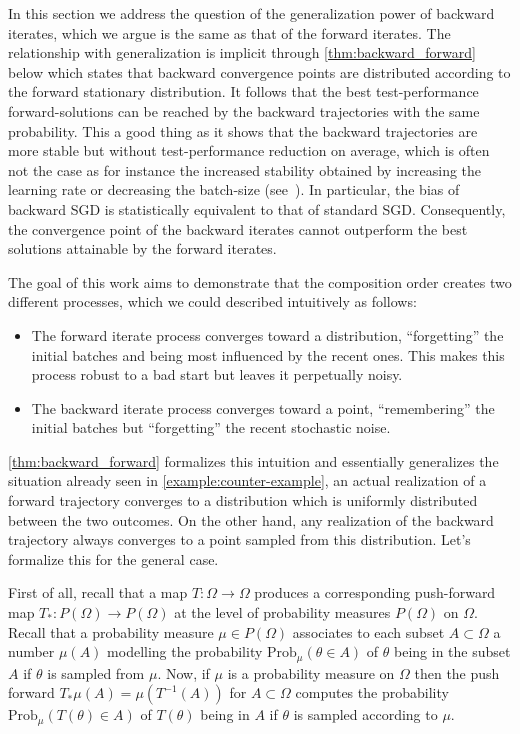 \documentclass[10pt]{article} %
\theoremstyle{plain}
\theoremstyle{definition}
\theoremstyle{remark}
\begin{document}
In this section we address the question of the generalization power of backward iterates, which we argue is the same as that of the forward iterates. The relationship with generalization is implicit through \cref{thm:backward_forward} below which states that backward convergence points are distributed according to the forward stationary distribution. It follows that the best test-performance forward-solutions can be reached by the backward trajectories with the same probability. This a good thing  as it shows that the backward trajectories are more stable but without test-performance reduction on average, which is often not the case as for instance the increased stability obtained by increasing the learning rate or decreasing the batch-size (see~\cite{dherin2022why}). 
In particular, the bias of backward SGD is statistically equivalent to that of standard SGD.
Consequently, the convergence point of the backward iterates cannot outperform the best solutions attainable by the forward iterates. 

The goal of this work aims to demonstrate that the composition order creates two different processes, which we could described intuitively as follows:

\begin{itemize}
\item The forward iterate process converges toward a distribution, ``forgetting'' the initial batches and being most influenced by the recent ones. This makes this process robust to a bad start but leaves it perpetually noisy.

\item The backward iterate process converges toward a point, ``remembering'' the initial batches but ``forgetting'' the recent stochastic noise.
\end{itemize}


\cref{thm:backward_forward}  formalizes this intuition and essentially generalizes the situation already seen in \cref{example:counter-example}, an actual realization of a forward trajectory converges to a distribution which is uniformly distributed between the two outcomes. On the other hand, any realization of the backward trajectory always converges to a point sampled from this distribution. Let's formalize this for the general case.

First of all, recall that a map $T:\Omega\rightarrow \Omega$ produces a corresponding push-forward map $T_*:P(\Omega)\rightarrow P(\Omega)$ at the level of probability measures $P(\Omega)$ on $\Omega$. Recall that a probability measure $\mu\in P(\Omega)$ associates to each subset $A\subset \Omega$ a number $\mu(A)$ modelling the probability $\textrm{Prob}_\mu(\theta \in A)$ of $\theta$ being in the subset $A$ if $\theta$ is sampled from $\mu$.
Now, if $\mu$ is a probability measure on $\Omega$ then the push forward $T_* \mu (A) = \mu (T^{-1}(A))$ for $A\subset \Omega$ computes the probability $\textrm{Prob}_\mu(T(\theta)\in A)$ of $T(\theta)$ being in $A$ if $\theta$ is sampled according to $\mu$. 
\end{document}
